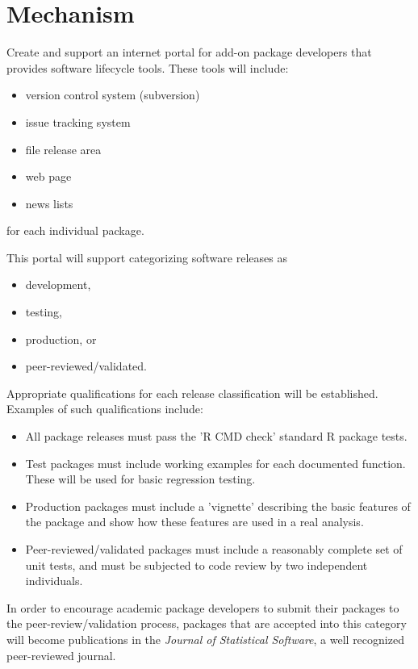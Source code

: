 \documentclass[12pt]{article}
\begin{document}
\section{Mechanism}

Create and support an internet portal for add-on package developers
that provides software lifecycle tools.  These tools will include:
\begin{itemize}
\item version control system (subversion)
\item issue tracking system
\item file release area
\item web page
\item news lists
\end{itemize} for each individual package.

This portal will support categorizing software releases as
\begin{itemize}
\item development,
\item testing,
\item production, or
\item peer-reviewed/validated.
\end{itemize}

Appropriate qualifications for each release classification will be
established.  Examples of such qualifications include:
\begin{itemize}
\item All package releases must pass the 'R CMD check'
  standard R package tests.
\item Test packages must include working examples for each documented
  function.  These will be used for basic regression testing.
\item Production packages must include a 'vignette' describing the
  basic features of the package and show how these features are used
  in a real analysis.
\item Peer-reviewed/validated packages must include a reasonably
  complete set of unit tests, and must be subjected to code review by
  two independent individuals.
\end{itemize}

In order to encourage academic package developers to submit their
packages to the peer-review/validation process, packages that are
accepted into this category will become publications in the
\emph{Journal of Statistical Software}, a well recognized
peer-reviewed journal.
\end{document}

